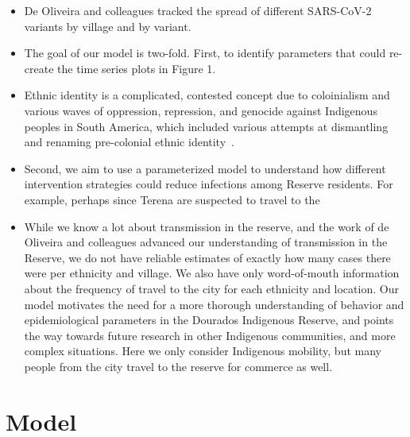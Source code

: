 \documentclass[
  letterpaper,
  abstract]{scrartcl}
\begin{document}
\begin{itemize}
\item
  De Oliveira and colleagues tracked the spread of different SARS-CoV-2
  variants by village and by variant.
\item
  The goal of our model is two-fold. First, to identify parameters that
  could re-create the time series plots in Figure 1.
\item
  Ethnic identity is a complicated, contested concept due to coloinialism and
  various waves of oppression, repression, and genocide against Indigenous
  peoples in South America, which included various attempts at dismantling 
  and renaming pre-colonial ethnic
  identity~\autocite{Brandão1990,FerreiraThomazDeAlmeida2018,Soratto2022}.
\item
  Second, we aim to use a parameterized model to understand how
  different intervention strategies could reduce infections among
  Reserve residents. For example, perhaps since Terena are suspected to
  travel to the
\item
  While we know a lot about transmission in the reserve, and the work of
  de Oliveira and colleagues advanced our understanding of transmission
  in the Reserve, we do not have reliable estimates of exactly how many
  cases there were per ethnicity and village. We also have only
  word-of-mouth information about the frequency of travel to the city
  for each ethnicity and location. Our model motivates the need for a
  more thorough understanding of behavior and epidemiological parameters
  in the Dourados Indigenous Reserve, and points the way towards future
  research in other Indigenous communities, and more complex situations.
  Here we only consider Indigenous mobility, but many people from the
  city travel to the reserve for commerce as well.
\end{itemize}

\section{Model}\label{sec:model}
\end{document}
